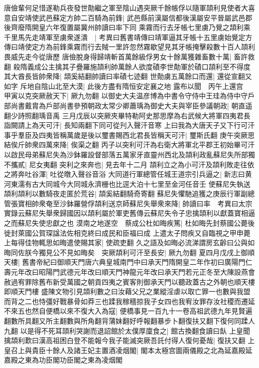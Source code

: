 唐儉輩何足惜遂勒兵夜發世勣繼之軍至陰山遇突厥千餘帳俘以隨軍頡利見使者大喜意自安靖使武邑蘇定方帥二百騎為前鋒|{
	武邑縣前漢屬信都後漢屬安平晉屬武邑郡後齊廢隋開皇六年復置屬冀州帥讀曰率下同}
乘霧而行去牙帳七里虜乃覺之頡利乘千里馬先走靖軍至虜衆遂潰　|{
	考異曰舊書靖傳曰靖軍逼其牙帳十五里虜始覺定方傳曰靖使定方為前鋒乘霧而行去賊一里許忽然霧歇望見其牙帳掩擊殺數十百人頡利畏威先走今從唐歷}
唐儉脫身得歸靖斬首萬餘級俘男女十餘萬獲雜畜數十萬|{
	畜許救翻}
殺隋義成公主擒其子疊羅施頡利帥萬餘人欲度磧李世勣軍於磧口頡利至不得度其大酋長皆帥衆降|{
	頡奚結翻帥讀曰率磧七迹翻}
世勣虜五萬餘口而還|{
	還從宣翻又如字}
斥地自陰山北至大漠|{
	此後方盡有隋恒安定襄之地}
露布以聞　丙午上還宫　甲寅以克突厥赦天下|{
	厥九勿翻}
以御史大夫温彦博為中書令守侍中王珪為侍中守戶部尚書戴胄為戶部尚書參預朝政太常少卿蕭瑀為御史大夫與宰臣參議朝政|{
	朝直遥翻少詩照翻瑀音禹}
三月戊辰以突厥夾畢特勒阿史那思摩為右武候大將軍四夷君長詣闕請上為天可汗|{
	長知兩翻下同可從刋入聲汗音寒}
上曰我為大唐天子又下行可汗事乎羣臣及四夷皆稱萬歲是後以璽書賜西北君長皆稱天可汗|{
	璽斯氏翻}
庚午突厥思結俟斤帥衆四萬來降|{
	俟渠之翻}
丙子以突利可汗為右衛大將軍北平郡王初始畢可汗以啟民母弟蘇尼失為沙鉢羅設督部落五萬家牙直靈州西北及頡利政亂蘇尼失所部獨不攜貳|{
	尼女夷翻}
突利之來奔也|{
	見去年十二月}
頡利立之為小可汗及頡利敗走往依之將奔吐谷渾|{
	吐從暾入聲谷音浴}
大同道行軍總管任城王道宗引兵逼之|{
	新志曰黄河東濡有古大同城今大同城永濟栅也比逕大泊十七里至金河任音壬}
使蘇尼失執送頡利頡利以數騎夜走匿於荒谷|{
	頡奚結翻騎奇寄翻}
蘇尼失懼馳追獲之庚辰行軍副總管張寶相帥衆奄至沙鉢羅營俘頡利送京師蘇尼失舉衆來降|{
	帥讀曰率　考異曰太宗實錄云蘇尼失舉衆歸國因以頡利屬於軍吏舊傳云蘇尼失令子忠擒頡利以獻蓋寶相逼之而蘇尼失使忠獻之也}
漠南之地遂空　蔡成公杜如晦疾篤|{
	杜如晦先封蔡國公薨後徙封萊國公賀琛諡法佐相克終曰成民和臣福曰成}
上遣太子問疾又自臨視之甲申薨上每得佳物輒思如晦遣使賜其家|{
	使疏吏翻}
久之語及如晦必流涕謂房玄齡曰公與如晦同佐朕今獨見公不見如晦矣　突厥頡利可汗至長安|{
	厥九勿翻}
夏四月戊戌上御順天樓|{
	舊書帝紀曰御順天門唐六典皇城南門中曰承天門隋開皇二年作初曰廣陽門仁壽元年改曰昭陽門武德元年改曰順天門神龍元年改曰承天門若元正冬至大陳設燕會赦過宥罪除舊布新受萬國之朝貢四夷之賓客則御承天門以聽政蓋古之外朝也順天樓即順天門樓}
盛陳文物引見頡利數之曰汝藉父兄之業縱淫虐以取亡罪一也數與我盟而背之二也恃彊好戰暴骨如莽三也蹂我稼穡掠我子女四也我宥汝罪存汝社稷而遷延不來五也然自便橋以來不復大入為寇|{
	便橋事見一百九十一卷高祖武德九年見賢遍翻數所具翻又所主翻數與所角翻背蒲妹翻好呼報翻暴步卜翻復扶又翻下復何同蹂人九翻}
以是得不死耳頡利哭謝而退詔館於太僕厚廩食之|{
	館古換翻食讀曰飤}
上皇聞擒頡利歎曰漢高祖困白登不能報今我子能滅突厥吾託付得人復何憂哉|{
	復扶又翻}
上皇召上與貴臣十餘人及諸王妃主置酒凌烟閣|{
	閣本太極宫圖兩儀殿之北為延嘉殿延嘉殿之東為功臣閣功臣閣之東為凌烟閣}
